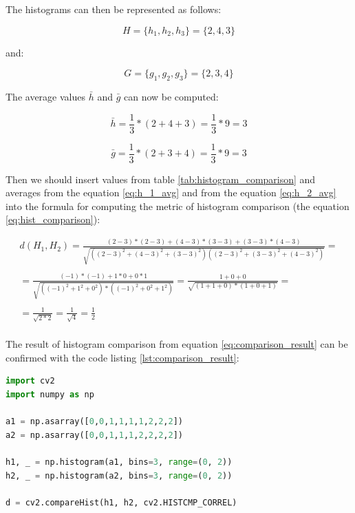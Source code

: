 The histograms can then be represented as follows:

\begin{equation*}
	H = \{h_1, h_2, h_3\} = \{2, 4, 3\}
\end{equation*}

and:

\begin{equation*}
	G = \{g_1, g_2, g_3\} = \{2, 3, 4\}
\end{equation*}

The average values $\bar{h}$ and $\bar{g}$ can now be computed:

\begin{equation}
	\bar{h} = \frac{1}{3} * (2 + 4 + 3) = \frac{1}{3} * 9 = 3
	\label{eq:h_1_avg}
\end{equation}

\begin{equation}
	\bar{g} = \frac{1}{3} * (2 + 3 + 4) = \frac{1}{3} * 9 = 3
	\label{eq:h_2_avg}
\end{equation}

Then we should insert values from table \ref{tab:histogram_comparison} and averages from the equation \ref{eq:h_1_avg} and from the equation \ref{eq:h_2_avg} into the formula for computing the metric of histogram comparison (the equation \ref{eq:hist_comparison}):

\begin{equation}
\begin{aligned}
	d(H_1, H_2) = \frac{(2-3)*(2-3) + (4-3)*(3-3) + (3-3)*(4-3)}{\sqrt{((2-3)^2 + (4-3)^2 + (3-3)^2)((2-3)^2 + (3-3)^2 + (4-3)^2)}} = \\ \\ 
	= \frac{(-1) * (-1) + 1 * 0 + 0 * 1}{\sqrt{((-1)^2 + 1^2 + 0^2) * ((-1)^2 + 0^2 + 1^2)}} 
	= \frac{1 + 0 + 0}{\sqrt{(1+1+0)*(1+0+1)}} = \\ \\
	= \frac{1}{\sqrt{2 * 2}} = \frac{1}{\sqrt{4}} = \frac{1}{2}
	\label{eq:comparison_result}
\end{aligned}
\end{equation}

\paragraph{}
The result of histogram comparison from equation \ref{eq:comparison_result} can be confirmed with the code listing \ref{lst:comparison_result}:

\begin{lstlisting}[language=Python, caption=Histogram comparison in Python, label={lst:comparison_result},basicstyle={\ttfamily}]
import cv2
import numpy as np

a1 = np.asarray([0,0,1,1,1,1,2,2,2])
a2 = np.asarray([0,0,1,1,1,2,2,2,2])

h1, _ = np.histogram(a1, bins=3, range=(0, 2))
h2, _ = np.histogram(a2, bins=3, range=(0, 2))

d = cv2.compareHist(h1, h2, cv2.HISTCMP_CORREL)
\end{lstlisting}

